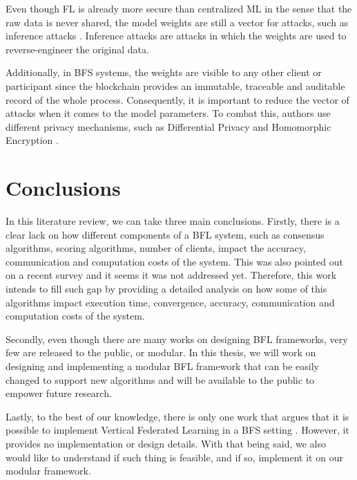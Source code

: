 Even though FL is already more secure than centralized ML in the sense that the raw data is never shared, the model weights are still a vector for attacks, such as inference attacks \cite{10.1145/3298981}. Inference attacks are attacks in which the weights are used to reverse-engineer the original data.

Additionally, in BFS systems, the weights are visible to any other client or participant since the blockchain provides an immutable, traceable and auditable record of the whole process. Consequently, it is important to reduce the vector of attacks when it comes to the model parameters. To combat this, authors use different privacy mechanisms, such as Differential Privacy \cite{10.48550/arxiv.2007.03856, Peyvandi2022, 9170559} and Homomorphic Encryption \cite{8945913, 8894364}.

\section{Conclusions}\label{related_work:conclusions}

In this literature review, we can take three main conclusions. Firstly, there is a clear lack on how different components of a BFL system, such as consensus algorithms, scoring algorithms, number of clients, impact the accuracy, communication and computation costs of the system. This was also pointed out on a recent survey \cite{9403374} and it seems it was not addressed yet. Therefore, this work intends to fill such gap by providing a detailed analysis on how some of this algorithms impact execution time, convergence, accuracy, communication and computation costs of the system.

Secondly, even though there are many works on designing BFL frameworks, very few are released to the public, or modular. In this thesis, we will work on designing and implementing a modular BFL framework that can be easily changed to support new algorithms and will be available to the public to empower future research.

Lastly, to the best of our knowledge, there is only one work that argues that it is possible to implement Vertical Federated Learning in a BFS setting \cite{10.48550/arxiv.1912.04859}. However, it provides no implementation or design details. With that being said, we also would like to understand if such thing is feasible, and if so, implement it on our modular framework.




